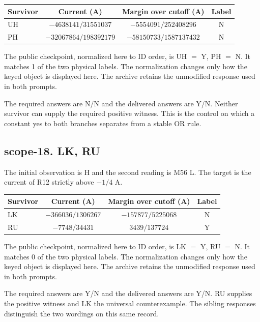 \documentclass[12pt,letterpaper]{article}
\begin{document}
\begin{center}{\small\setlength{\tabcolsep}{4pt}\begin{tabularx}{\linewidth}{@{}Yccc@{}}\toprule
Survivor & Current (A) & Margin over cutoff (A) & Label\\\midrule
UH & $-4638141/31551037$ & $-5554091/252408296$ & N\\
PH & $-32067864/198392179$ & $-58150733/1587137432$ & N\\
\bottomrule\end{tabularx}}\end{center}

The public checkpoint, normalized here to ID order, is UH $=$ Y, PH $=$ N. It matches 1 of the two physical labels. The normalization changes only how the keyed object is displayed here. The archive retains the unmodified response used in both prompts.

The required answers are N/N and the delivered answers are Y/N. Neither survivor can supply the required positive witness. This is the control on which a constant yes to both branches separates from a stable OR rule.

\subsection*{scope-18. LK, RU}

The initial observation is H and the second reading is M56 L. The target is the current of R12 strictly above $-1/4$ A.

\begin{center}{\small\setlength{\tabcolsep}{4pt}\begin{tabularx}{\linewidth}{@{}Yccc@{}}\toprule
Survivor & Current (A) & Margin over cutoff (A) & Label\\\midrule
LK & $-366036/1306267$ & $-157877/5225068$ & N\\
RU & $-7748/34431$ & $3439/137724$ & Y\\
\bottomrule\end{tabularx}}\end{center}

The public checkpoint, normalized here to ID order, is LK $=$ Y, RU $=$ N. It matches 0 of the two physical labels. The normalization changes only how the keyed object is displayed here. The archive retains the unmodified response used in both prompts.

The required answers are Y/N and the delivered answers are Y/N. RU supplies the positive witness and LK the universal counterexample. The sibling responses distinguish the two wordings on this same record.
\end{document}
